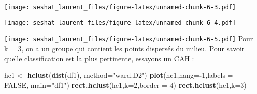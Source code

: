\documentclass[
]{article}
\newenvironment{Shaded}{\begin{snugshade}}{\end{snugshade}}
\newcommand{\DataTypeTok}[1]{\textcolor[rgb]{0.13,0.29,0.53}{#1}}
\newcommand{\DecValTok}[1]{\textcolor[rgb]{0.00,0.00,0.81}{#1}}
\newcommand{\KeywordTok}[1]{\textcolor[rgb]{0.13,0.29,0.53}{\textbf{#1}}}
\newcommand{\NormalTok}[1]{#1}
\newcommand{\OperatorTok}[1]{\textcolor[rgb]{0.81,0.36,0.00}{\textbf{#1}}}
\newcommand{\OtherTok}[1]{\textcolor[rgb]{0.56,0.35,0.01}{#1}}
\newcommand{\StringTok}[1]{\textcolor[rgb]{0.31,0.60,0.02}{#1}}
\begin{document}
\texttt{[image: seshat\_laurent\_files/figure-latex/unnamed-chunk-6-3.pdf]}

\begin{Shaded}
\end{Shaded}

\texttt{[image: seshat\_laurent\_files/figure-latex/unnamed-chunk-6-4.pdf]}

\begin{Shaded}
\end{Shaded}

\texttt{[image: seshat\_laurent\_files/figure-latex/unnamed-chunk-6-5.pdf]}
Pour k = 3, on a un groupe qui contient les points dispersés du milieu.
Pour savoir quelle classification est la plus pertinente, essayons un
CAH :

\begin{Shaded}
\begin{Highlighting}[]
\NormalTok{hc1 <-}\StringTok{ }\KeywordTok{hclust}\NormalTok{(}\KeywordTok{dist}\NormalTok{(df1), }\DataTypeTok{method=}\StringTok{"ward.D2"}\NormalTok{)}
\KeywordTok{plot}\NormalTok{(hc1,}\DataTypeTok{hang=}\OperatorTok{-}\DecValTok{1}\NormalTok{,}\DataTypeTok{labels =} \OtherTok{FALSE}\NormalTok{, }\DataTypeTok{main=}\StringTok{"df1"}\NormalTok{)}
\KeywordTok{rect.hclust}\NormalTok{(hc1,}\DataTypeTok{k=}\DecValTok{2}\NormalTok{,}\DataTypeTok{border =} \DecValTok{4}\NormalTok{)}
\KeywordTok{rect.hclust}\NormalTok{(hc1,}\DataTypeTok{k=}\DecValTok{3}\NormalTok{)}
\end{Highlighting}
\end{Shaded}
\end{document}
